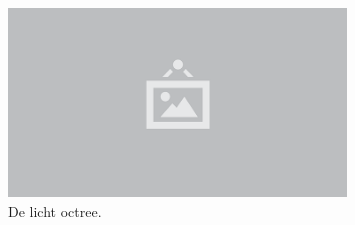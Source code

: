 \begin{figure}
  \centering
  \includegraphics[width=0.8\textwidth]{./img/raw/placeholder.png}
  \caption{De licht octree.}
  \label{fig:hs-licht-octree}
\end{figure}
